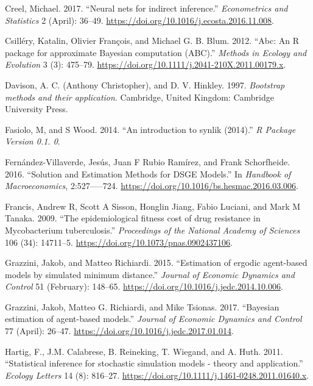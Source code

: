 \documentclass[]{article}
\begin{document}
\leavevmode\hypertarget{ref-Creel2017}{}%
Creel, Michael. 2017. ``Neural nets for indirect inference.'' \emph{Econometrics and Statistics} 2 (April): 36--49. \url{https://doi.org/10.1016/j.ecosta.2016.11.008}.

\leavevmode\hypertarget{ref-Csillery2012}{}%
Csilléry, Katalin, Olivier François, and Michael G. B. Blum. 2012. ``Abc: An R package for approximate Bayesian computation (ABC).'' \emph{Methods in Ecology and Evolution} 3 (3): 475--79. \url{https://doi.org/10.1111/j.2041-210X.2011.00179.x}.

\leavevmode\hypertarget{ref-Davison}{}%
Davison, A. C. (Anthony Christopher), and D. V. Hinkley. 1997. \emph{Bootstrap methods and their application}. Cambridge, United Kingdom: Cambridge University Press.

\leavevmode\hypertarget{ref-fasiolo2014introduction}{}%
Fasiolo, M, and S Wood. 2014. ``An introduction to synlik (2014).'' \emph{R Package Version 0.1. 0}.

\leavevmode\hypertarget{ref-Fernandez-Villaverde2015}{}%
Fernández-Villaverde, Jesús, Juan F Rubio Ramírez, and Frank Schorfheide. 2016. ``Solution and Estimation Methods for DSGE Models.'' In \emph{Handbook of Macroeconomics}, 2:527-----724. \url{https://doi.org/10.1016/bs.hesmac.2016.03.006}.

\leavevmode\hypertarget{ref-Francis2009}{}%
Francis, Andrew R, Scott A Sisson, Honglin Jiang, Fabio Luciani, and Mark M Tanaka. 2009. ``The epidemiological fitness cost of drug resistance in Mycobacterium tuberculosis.'' \emph{Proceedings of the National Academy of Sciences} 106 (34): 14711--5. \url{https://doi.org/10.1073/pnas.0902437106}.

\leavevmode\hypertarget{ref-Grazzini2015}{}%
Grazzini, Jakob, and Matteo Richiardi. 2015. ``Estimation of ergodic agent-based models by simulated minimum distance.'' \emph{Journal of Economic Dynamics and Control} 51 (February): 148--65. \url{https://doi.org/10.1016/j.jedc.2014.10.006}.

\leavevmode\hypertarget{ref-Grazzini2017}{}%
Grazzini, Jakob, Matteo G. Richiardi, and Mike Tsionas. 2017. ``Bayesian estimation of agent-based models.'' \emph{Journal of Economic Dynamics and Control} 77 (April): 26--47. \url{https://doi.org/10.1016/j.jedc.2017.01.014}.

\leavevmode\hypertarget{ref-hartig_statistical_2011}{}%
Hartig, F., J.M. Calabrese, B. Reineking, T. Wiegand, and A. Huth. 2011. ``Statistical inference for stochastic simulation models - theory and application.'' \emph{Ecology Letters} 14 (8): 816--27. \url{https://doi.org/10.1111/j.1461-0248.2011.01640.x}.
\end{document}
